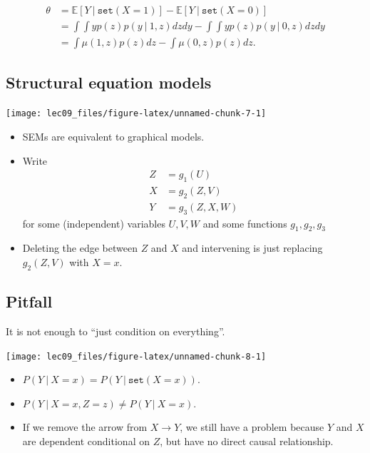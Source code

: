 \documentclass[]{article}
\providecommand{\tightlist}{%
  \setlength{\itemsep}{0pt}\setlength{\parskip}{0pt}}
\begin{document}
\[
\begin{aligned}
\theta &= \mathbb{E}\left[ Y \ \vert\ \texttt{set}(X=1) \right] - \mathbb{E}\left[ Y \ \vert\ \texttt{set}(X=0) \right]\\
 &= \int \int yp(z)p(y\ \vert\ 1,z)dzdy - \int \int yp(z)p(y\ \vert\ 0,z)dzdy\\
 &= \int \mu(1,z)p(z)dz - \int \mu(0,z)p(z)dz.
\end{aligned}
\]

\hypertarget{structural-equation-models}{%
\subsection{Structural equation
models}\label{structural-equation-models}}

\begin{center}\texttt{[image: lec09\_files/figure-latex/unnamed-chunk-7-1]} \end{center}

\begin{itemize}
\item
  SEMs are equivalent to graphical models.
\item
  Write \[
  \begin{aligned}
  Z &= g_1(U)\\
  X &= g_2(Z,V)\\
  Y &= g_3(Z,X,W)
  \end{aligned}
  \] for some (independent) variables \(U,V,W\) and some functions
  \(g_1,g_2,g_3\)
\item
  Deleting the edge between \(Z\) and \(X\) and intervening is just
  replacing \(g_2(Z,V)\) with \(X=x\).
\end{itemize}

\hypertarget{pitfall}{%
\subsection{Pitfall}\label{pitfall}}

It is not enough to ``just condition on everything''.

\begin{center}\texttt{[image: lec09\_files/figure-latex/unnamed-chunk-8-1]} \end{center}

\begin{itemize}
\tightlist
\item
  \(P(Y \ \vert\ X=x) = P(Y \ \vert\ \texttt{set}(X=x))\).
\item
  \(P(Y \ \vert\ X=x, Z=z) \neq P(Y \ \vert\ X=x)\).
\item
  If we remove the arrow from \(X\rightarrow Y\), we still have a
  problem because \(Y\) and \(X\) are dependent conditional on \(Z\),
  but have no direct causal relationship.
\end{itemize}
\end{document}
